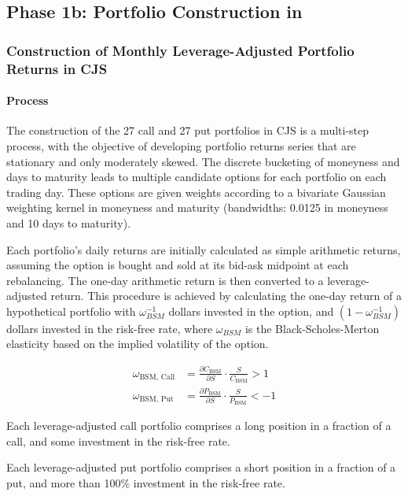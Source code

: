 \documentclass[11pt]{article}
\begin{document}
\subsection{Phase 1b: Portfolio Construction in \citet{Constantinides2013}}
\subsubsection{Construction of Monthly Leverage-Adjusted Portfolio Returns in CJS}

\paragraph{Process}
The construction of the 27 call and 27 put portfolios in CJS is a multi-step process, with the objective of developing portfolio returns series that are stationary and only moderately skewed. The discrete bucketing of moneyness and days to maturity leads to multiple candidate options for each portfolio on each trading day. These options are given weights according to a bivariate Gaussian weighting kernel in moneyness and maturity (bandwidths: 0.0125 in moneyness and 10 days to maturity).

Each portfolio's daily returns are initially calculated as simple arithmetic returns, assuming the option is bought and sold at its bid-ask midpoint at each rebalancing. The one-day arithmetic return is then converted to a leverage-adjusted return. This procedure is achieved by calculating the one-day return of a hypothetical portfolio with $\omega_{BSM}^{-1}$ dollars invested in the option, and $(1 - \omega_{BSM}^{-1})$ dollars invested in the risk-free rate, where $\omega_{BSM}$ is the Black-Scholes-Merton elasticity based on the implied volatility of the option.

\begin{align}
\omega_{\text{BSM, Call}} &= \frac{\partial C_{\text{BSM}}}{\partial S} \cdot \frac{S}{C_{\text{BSM}}} > 1 \\
\omega_{\text{BSM, Put}}  &= \frac{\partial P_{\text{BSM}}}{\partial S} \cdot \frac{S}{P_{\text{BSM}}} < -1
\end{align}

Each leverage-adjusted call portfolio comprises a long position in a fraction of a call, and some investment in the risk-free rate.

Each leverage-adjusted put portfolio comprises a short position in a fraction of a put, and more than 100\% investment in the risk-free rate.
\end{document}
